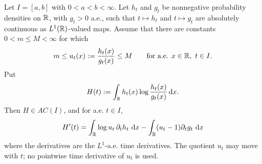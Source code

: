 \begin{lemma}%
\label{prop:abstract-cutoff-bregman-kl}
\label{lem:cauchy-kl-cutoff-green-identity}
\label{thm:external-cauchy-kl-hardystein-input}
\label{prop:self-contained-cauchy-kl-hardystein}
\label{lem:poisson-kl-l1-ac-chain-rule}
\label{thm:kl-domain-verification}
\label{lem:poisson-quotient-cutoff-bregman-verification}
\label{lem:kl-tail-chain-rule-cutoff-passage}
\label{prop:kl-tail-cutoff-inputs}
\label{thm:kl-local-doob-bregman-domain-closure}
\label{prop:kl-local-doob-bregman-domain-closure}
Let \(I=[a,b]\) with \(0<a<b<\infty\).  Let \(h_t\) and \(g_t\) be
nonnegative probability densities on \(\mathbb{R}\), with \(g_t>0\) a.e., such that
\(t\mapsto h_t\) and \(t\mapsto g_t\) are absolutely continuous as
\(L^1(\mathbb{R})\)-valued maps.  Assume that there are constants
\(0<m\le M<\infty\) for which
\[
m\le u_t(x):=\frac{h_t(x)}{g_t(x)}\le M
\qquad\text{for a.e. }x\in\mathbb{R},\ t\in I .
\]
Put
\[
H(t):=\int_{\mathbb{R}}h_t(x)\log\frac{h_t(x)}{g_t(x)}\,\mathrm{d} x .
\]
Then \(H\in AC(I)\), and for a.e. \(t\in I\),
\begin{equation}\label{eq:kl-moving-quotient-l1-chain-rule}
H'(t)=
\int_{\mathbb{R}}\log u_t\,\partial_th_t\,\,\mathrm{d} x
-\int_{\mathbb{R}}(u_t-1)\partial_tg_t\,\,\mathrm{d} x
\end{equation}
where the derivatives are the \(L^1\)-a.e. time derivatives.  The quotient
\(u_t\) may move with \(t\); no pointwise time derivative of \(u_t\) is used.
\end{lemma}

